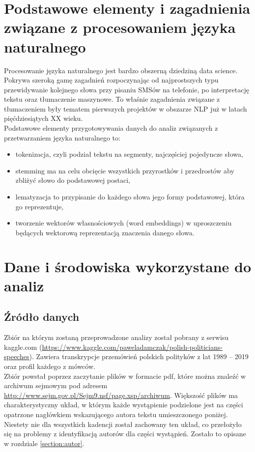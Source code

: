 \documentclass[a4paper,11pt,twoside]{report}
\theoremstyle{definition}
\begin{document}
\chapter{Podstawowe elementy i zagadnienia związane z procesowaniem języka naturalnego}
Procesowanie języka naturalnego jest bardzo obszerną dziedziną data science. Pokrywa szeroką gamę zagadnień rozpoczynając od najprostszych typu przewidywanie kolejnego słowa przy pisaniu SMSów na telefonie, po interpretację tekstu oraz tłumaczenie maszynowe. To właśnie zagadnienia związane z tłumaczeniem były tematem pierwszych projektów w obszarze NLP już w latach pięćdziesiątych XX wieku. \\
Podstawowe elementy przygotowywania danych do analiz związanych z przetwarzaniem języka naturalnego to:

\begin{itemize}
 \item tokenizacja, czyli podział tekstu na segmenty, najczęściej pojedyncze słowa,
 \item stemming ma na celu obcięcie wszystkich przyrostków i przedrostów aby zbliżyć słowo do podstawowej postaci,
 \item lematyzacja to przypisanie do każdego słowa jego formy podstawowej, która go reprezentuje, 
 \item tworzenie wektorów własnościowych (word embeddings) w uproszczeniu będących wektorową reprezentacją znaczenia danego słowa.
\end{itemize}


\chapter{Dane i środowiska wykorzystane do analiz}

\section{Źródło danych}
Zbiór na którym zostaną przeprowadzone analizy został pobrany z serwisu kaggle.com (\url{https://www.kaggle.com/paweladamczak/polish-politicians-speeches}). Zawiera transkrypcje przemówień polskich polityków  z lat 1989 – 2019 oraz profil każdego z mówców. \\
Zbiór powstał poprzez zaczytanie plików w formacie pdf, które można znaleźć w archiwum sejmowym pod adresem \url{http://www.sejm.gov.pl/Sejm9.nsf/page.xsp/archiwum}. Większość plików ma charakterystyczny układ, w którym każde wystąpienie podzielone jest na części opatrzone nagłówkiem wskazującego autora tekstu umieszczonego poniżej. Niestety nie dla wszystkich kadencji został zachowany ten układ, co przełożyło się na problemy z identyfikacją autorów dla części wystąpień. Zostało to opisane w rozdziale \ref{section:autor}.
\end{document}
